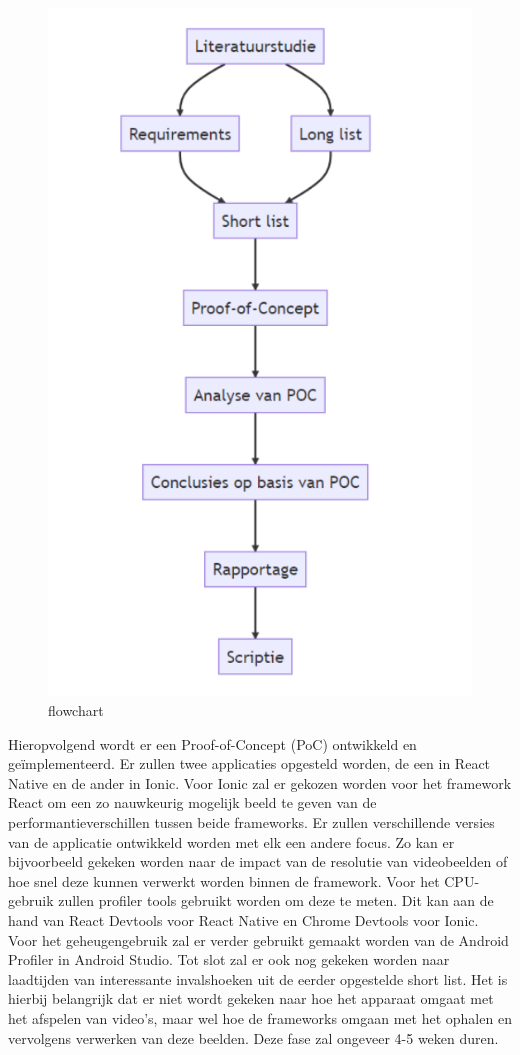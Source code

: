 \begin{figure}
  \centering
  \includegraphics[width=0.7\linewidth]{img/flowchart}
  \caption{flowchart}
  \label{fig:flowchart}
\end{figure}

Hieropvolgend wordt er een Proof-of-Concept (PoC) ontwikkeld en geïmplementeerd. Er zullen twee applicaties opgesteld worden, de een in React Native en de ander in Ionic. Voor Ionic zal er gekozen worden voor het framework React om een zo nauwkeurig mogelijk beeld te geven van de performantieverschillen tussen beide frameworks. Er zullen verschillende versies van de applicatie ontwikkeld worden met elk een andere focus. Zo kan er bijvoorbeeld gekeken worden naar de impact van de resolutie van videobeelden of hoe snel deze kunnen verwerkt worden binnen de framework. Voor het CPU-gebruik zullen profiler tools gebruikt worden om deze te meten. Dit kan aan de hand van React Devtools voor React Native en Chrome Devtools voor Ionic. Voor het geheugengebruik zal er verder gebruikt gemaakt worden van de Android Profiler in Android Studio. Tot slot zal er ook nog gekeken worden naar laadtijden van interessante invalshoeken uit de eerder opgestelde short list. Het is hierbij belangrijk dat er niet wordt gekeken naar hoe het apparaat omgaat met het afspelen van video's, maar wel hoe de frameworks omgaan met het ophalen en vervolgens verwerken van deze beelden. Deze fase zal ongeveer 4-5 weken duren.

